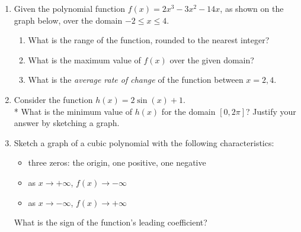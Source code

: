 \documentclass[12pt, oneside]{article}
\begin{document}
\begin{enumerate}
\item Given the polynomial function $f(x)=2x^3-3x^2-14x$, as shown on the graph below, over the domain $-2 \leq x \leq 4$.
\begin{center}
\end{center}
\begin{enumerate}
    \item What is the range of the function, rounded to the nearest integer?\\[0.8in]
    \item What is the maximum value of $f(x)$ over the given domain?\\[0.8in]
    \item What is the \emph{average rate of change} of the function between $x=2,4$.
\end{enumerate}


\newpage

\item Consider the function $h(x) = 2\sin(x) + 1$.\\*
What is the minimum value of $h(x)$ for the domain $[0,2\pi]$? Justify your answer by sketching a graph. \\[2in]%


\item Sketch a graph of a cubic polynomial with the following characteristics: 
\begin{itemize}
\item three zeros: the origin, one positive, one negative
\item as $x \rightarrow + \infty$, $f(x) \rightarrow - \infty$
\item as $x \rightarrow - \infty$, $f(x) \rightarrow + \infty$
\end{itemize}
\begin{center}
\end{center} %
What is the sign of the function's leading coefficient?





\end{enumerate}
\end{document}
